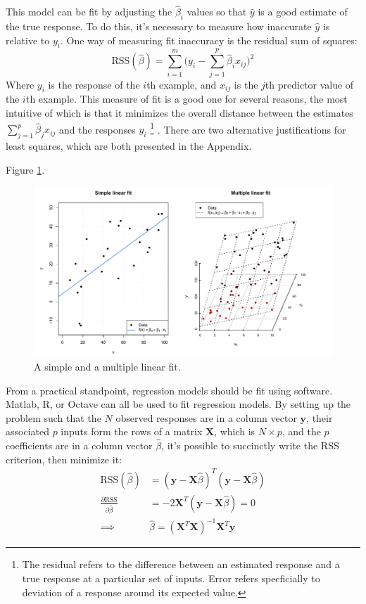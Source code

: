 \documentclass[11pt,a4paper,article]{memoir} %
\begin{document}
This model can be fit by adjusting the $\hat{\beta}_i$ values so that $\hat{y}$ is a good estimate of the true response. To do this, it's necessary to measure how inaccurate $\hat{y}$ is relative to $y_i$. One way of measuring fit inaccuracy is the residual sum of squares:
\begin{equation}
	\text{RSS}(\hat{\beta}) = \sum_{i = 1}^m \Big(y_i - \sum_{j = 1}^p \hat{\beta}_i x_{ij})^2
	\label{eq:rss}
\end{equation}
Where $y_i$ is the response of the $i$th example, and $x_{ij}$ is the $j$th predictor value of the $i$th example. This measure of fit is a good one for several reasons, the most intuitive of which is that it minimizes the overall distance between the estimates $\sum_{j = 1}^p \hat{\beta}_j x_{ij}$ and the responses $y_i$ \footnote{The residual refers to the difference between an estimated response and a true response at a particular set of inputs. Error refers specficially to deviation of a response around its expected value.} . There are two alternative justifications for least squares, which are both presented in the Appendix.

 Figure \ref{fig:linear_regression}. 
\begin{figure}
\includegraphics[width=\textwidth]{linear_fits.pdf}
\caption{A simple and a multiple linear fit.}
\label{fig:linear_regression}
\end{figure}

From a practical standpoint, regression models should be fit using software. Matlab, R, or Octave can all be used to fit regression models. By setting up the problem such that the $N$ observed responses are in a column vector $\mathbf{y}$, their associated $p$ inputs form the rows of a matrix $\mathbf{X}$, which is $N \times p$, and the $p$ coefficients are in a column vector $\hat{\beta}$, it's possible to succinctly write the RSS criterion, then minimize it:
\begin{align}
	\text{RSS}(\hat{\beta}) &= (\mathbf{y - X}\hat{\beta})^T(\mathbf{y - X}\hat{\beta}) \\
	\frac{\partial \text{RSS}}{\partial \hat{\beta}} &= -2\mathbf{X}^T(\mathbf{y - X}\hat{\beta}) = 0 \\
	\implies &\hat{\beta} = (\mathbf{X}^T\mathbf{X})^{-1}\mathbf{X}^T \mathbf{y} \label{eq:normal_eqtn}
\end{align}
\end{document}
